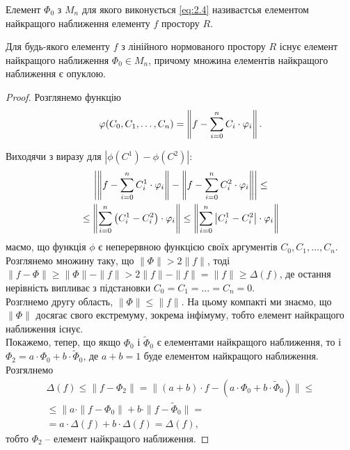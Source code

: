 \begin{definition}
	Елемент $\Phi_0$ з $M_n$ для якого виконується \eqref{eq:2.4} називаєтсья елементом найкращого наближення елементу $f$ простору $R$.
\end{definition}

\begin{theorem}
	Для будь-якого елементу $f$ з лінійного нормованого простору $R$ існує елемент найкращого наближення $\Phi_0 \in M_n$, причому множина елементів найкращого наближення є опуклою. 
\end{theorem}

\begin{proof}
	Розглянемо функцію
	\begin{equation}
		\label{eq:2.5}
		\varphi(C_0, C_1, \ldots, C_n) = \left\| f - \displaystyle\sum\limits_{i = 0}^n C_i \cdot \varphi_i \right\|.
	\end{equation}

	Виходячи з виразу для $|\phi(C^1) - \phi(C^2)|$:
	\begin{multline}
		\label{eq:2.6}
		\left| \left\| f - \displaystyle\sum\limits_{i = 0}^n C_i^1 \cdot \varphi_i \right\| - \left\| f - \displaystyle\sum\limits_{i = 0}^n C_i^2 \cdot \varphi_i \right\| \right| \le \\ \le \left\| \displaystyle\sum\limits_{i = 0}^n \left(C_i^1 - C_i^2\right) \cdot \varphi_i \right\| \le \left\| \displaystyle\sum\limits_{i = 0}^n \left|C_i^1 - C_i^2\right| \cdot \varphi_i \right\|
	\end{multline}
	маємо, що функція $\phi$ є неперервною функцією своїх аргументів $C_0, C_1, \ldots, C_n$. \\

	Розглянемо множину таку, що $\| \Phi \| > 2 \| f \|$, тоді $\| f - \Phi \| \ge \| \Phi \| - \| f \| > 2 \| f \| - \| f \| = \| f \| \ge \Delta (f)$, де остання нерівність випливає з підстановки $C_0 = C_1 = \ldots = C_n = 0$. \\

	Розглнемо другу область, $\| \Phi \| \le \| f \|$. На цьому компакті ми знаємо, що $\| \Phi \|$ досягає свого екстремуму, зокрема інфімуму, тобто елемент найкращого наближення існує. \\

	Покажемо, тепер, що якщо $\Phi_0$ і $\tilde \Phi_0$ є елементами найкращого наближення, то і $\Phi_2 = a \cdot \Phi_0 + b \cdot \tilde \Phi_0$, де $a + b = 1$ буде елементом найкращого наближення. \\

	Розгялнемо 
	\begin{multline}
		\label{eq:2.7}
		\Delta(f) \le \| f - \Phi_2 \| = \| (a + b) \cdot f - (a \cdot \Phi_0 + b \cdot \tilde \Phi_0) \| \le \\ \le \| a \cdot \| f - \Phi_0 \| + b \cdot \| f - \tilde \Phi_0 \| = \\ = a \cdot \Delta(f) + b \cdot \Delta(f) = \Delta(f),
	\end{multline}
	тобто $\Phi_2$ -- елемент найкращого наближення.
\end{proof}


